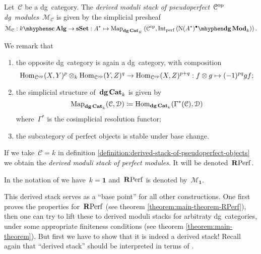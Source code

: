 \begin{refsection}
\begin{definition}
  Let~$\mathcal{C}$ be a dg~category. The \emph{derived moduli stack of pseudoperfect~$\mathcal{C}^{\mathrm{op}}$\dash dg~modules}~$\mathcal{M}_{\mathcal{C}}$ is given by the simplicial presheaf
  \begin{equation}
    \mathcal{M}_{\mathcal{C}}:\scAlg{k}\to\sSet:A^*\mapsto\Map_{\dgCat_K}\left( \mathcal{C}^\opp,\Int_\perf\left( \dgMod{\nerve(A^*)^\bullet}_k \right) \right).
  \end{equation}
\end{definition}

We remark that
\begin{enumerate}
  \item the opposite dg~category is again a dg~category, with composition
    \begin{equation}
      \mathrm{Hom}_{\mathcal{C}^{\mathrm{op}}}(X,Y)^p\otimes_k\mathrm{Hom}_{\mathcal{C}^{\mathrm{op}}}(Y,Z)^q\to\mathrm{Hom}_{\mathcal{C}^{\mathrm{op}}}(X,Z)^{p+q}:f\otimes g\mapsto(-1)^{pq}gf;
    \end{equation}
  \item the simplicial structure of~$\mathbf{dg\,Cat}_k$ is given by
    \begin{equation}
      \operatorname{\mathrm{Map}}_{\mathbf{dg\,Cat}_k}(\mathcal{C},\mathcal{D})\coloneqq\mathrm{Hom}_{\mathbf{dg\,Cat}_k}(\Gamma^*(\mathcal{C}),\mathcal{D})
    \end{equation}
    where~$\Gamma^*$ is the cosimplicial resolution functor;
  \item the subcategory of perfect objects is stable under base change.
\end{enumerate}

\begin{definition}
  If we take~$\mathcal{C}=k$ in definition \ref{definition:derived-stack-of-pseudoperfect-objects} we obtain the \emph{derived moduli stack of perfect modules}. It will be denoted~$\mathbf{R}\mathrm{Perf}$.
\end{definition}

In the notation of \cite{toen-vaquie} we have~$k=\mathbf{1}$ and~$\mathbf{R}\mathrm{Perf}$ is denoted by~$\mathcal{M}_{\mathbf{1}}$.

This derived stack serves as a ``base point'' for all other constructions. One first proves the properties for~$\mathbf{R}\mathrm{Perf}$ (see theorem \ref{theorem:main-theorem-RPerf}), then one can try to lift these to derived moduli stacks for arbitraty dg~categories, under some appropriate finiteness conditions (see theorem \ref{theorem:main-theorem}). But first we have to show that it is indeed a derived stack! Recall again that ``derived stack'' should be interpreted in terms of \cite[definition 1.3.2.1]{hagII}.


\end{refsection}
